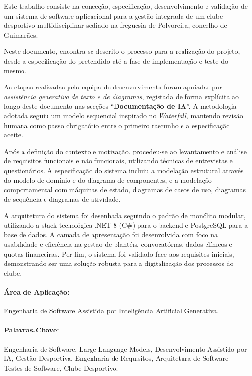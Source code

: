 \documentclass[a4paper,12pt]{scrreprt}
\begin{document}

\makecover



\renewenvironment{abstract}
 {\par\noindent\textbf{\Large\abstractname}\par\bigskip}
 {}

\begin{flushleft}
\begin{abstract}
Este trabalho consiste na conceção, especificação, desenvolvimento e validação de um sistema de software aplicacional para a gestão integrada de um clube desportivo multidisciplinar sediado na freguesia de Polvoreira, concelho de Guimarães.

Neste documento, encontra-se descrito o processo para a realização do projeto, desde a especificação do pretendido até a fase de implementação e teste do mesmo.

As etapas realizadas pela equipa de desenvolvimento foram apoiadas por \textit{assistência generativa de texto e de diagramas}, registada de forma explícita ao longo deste documento nas secções ``\textbf{Documentação de IA}''. A metodologia adotada seguiu um modelo sequencial inspirado no \textit{Waterfall}, mantendo revisão humana como passo obrigatório entre o primeiro rascunho e a especificação aceite.

Após a definição do contexto e motivação, procedeu-se ao levantamento e análise de requisitos funcionais e não funcionais, utilizando técnicas de entrevistas e questionários. A especificação do sistema incluiu a modelação estrutural através do modelo de domínio e do diagrama de componentes, e a modelação comportamental com máquinas de estado, diagramas de casos de uso, diagramas de sequência e diagramas de atividade.

A arquitetura do sistema foi desenhada seguindo o padrão de monólito modular, utilizando a stack tecnológica .NET 8 (C\#) para o backend e PostgreSQL para a base de dados. A camada de apresentação foi desenvolvida com foco na usabilidade e eficiência na gestão de plantéis, convocatórias, dados clínicos e quotas financeiras. Por fim, o sistema foi validado face aos requisitos iniciais, demonstrando ser uma solução robusta para a digitalização dos processos do clube.

    \paragraph*{Área de Aplicação:} Engenharia de Software Assistida por Inteligência Artificial Generativa.
    \paragraph*{Palavras-Chave:} Engenharia de Software, Large Language Models, Desenvolvimento Assistido por IA, Gestão Desportiva, Engenharia de Requisitos, Arquitetura de Software, Testes de Software, Clube Desportivo.
\end{abstract}
\end{flushleft}
\end{document}
